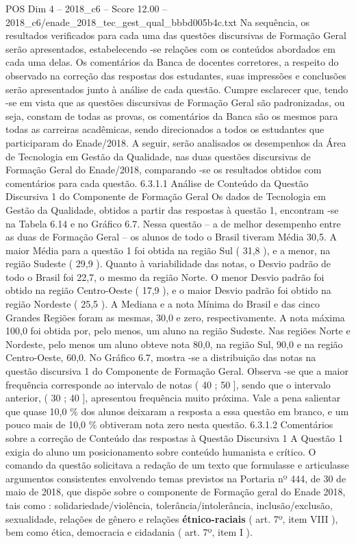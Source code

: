 \begin{textsample}{POS Dim 4 – 2018\_c6 – Score 12.00 – 2018\_c6/enade\_2018\_tec\_gest\_qual\_bbbd005b4c.txt}
Na sequência, os resultados verificados para cada uma das questões discursivas de Formação Geral serão apresentados, estabelecendo -se relações com os conteúdos abordados em cada uma delas.
Os comentários da Banca de docentes corretores, a respeito do observado na correção das respostas dos estudantes, suas impressões e conclusões serão apresentados junto à análise de cada questão.
Cumpre esclarecer que, tendo -se em vista que as questões discursivas de Formação Geral são padronizadas, ou seja, constam de todas as provas, os comentários da Banca são os mesmos para todas as carreiras acadêmicas, sendo direcionados a todos os estudantes que participaram do Enade/2018.
A seguir, serão analisados os desempenhos da Área de Tecnologia em Gestão da Qualidade, nas duas questões discursivas de Formação Geral do Enade/2018, comparando -se os resultados obtidos com comentários para cada questão. 6.3.1.1 Análise de Conteúdo da Questão Discursiva 1 do Componente de Formação Geral Os dados de Tecnologia em Gestão da Qualidade, obtidos a partir das respostas à questão 1, encontram -se na Tabela 6.14 e no Gráfico 6.7.
Nessa questão – a de melhor desempenho entre as duas de Formação Geral – os alunos de todo o Brasil tiveram Média 30,5.
A maior Média para a questão 1 foi obtida na região Sul ( 31,8 ), e a menor, na região Sudeste ( 29,9 ).
Quanto à variabilidade das notas, o Desvio padrão de todo o Brasil foi 22,7, o mesmo da região Norte.
O menor Desvio padrão foi obtido na região Centro-Oeste ( 17,9 ), e o maior Desvio padrão foi obtido na região Nordeste ( 25,5 ).
A Mediana e a nota Mínima do Brasil e das cinco Grandes Regiões foram as mesmas, 30,0 e zero, respectivamente.
A nota máxima 100,0 foi obtida por, pelo menos, um aluno na região Sudeste.
Nas regiões Norte e Nordeste, pelo menos um aluno obteve nota 80,0, na região Sul, 90,0 e na região Centro-Oeste, 60,0.
No Gráfico 6.7, mostra -se a distribuição das notas na questão discursiva 1 do Componente de Formação Geral.
Observa -se que a maior frequência corresponde ao intervalo de notas ( 40 ; 50 ], sendo que o intervalo anterior, ( 30 ; 40 ], apresentou frequência muito próxima.
Vale a pena salientar que quase 10,0 \% dos alunos deixaram a resposta a essa questão em branco, e um pouco mais de 10,0 \% obtiveram nota zero nesta questão. 6.3.1.2 Comentários sobre a correção de Conteúdo das respostas à Questão Discursiva 1 A Questão 1 exigia do aluno um posicionamento sobre conteúdo humanista e crítico.
O comando da questão solicitava a redação de um texto que formulasse e articulasse argumentos consistentes envolvendo temas previstos na Portaria nº 444, de 30 de maio de 2018, que dispõe sobre o componente de Formação geral do Enade 2018, tais como : solidariedade/violência, tolerância/intolerância, inclusão/exclusão, sexualidade, relações de gênero e relações \textbf{étnico-raciais} ( art. 7º, item VIII ), bem como ética, democracia e cidadania ( art. 7º, item I ).

\end{textsample}
